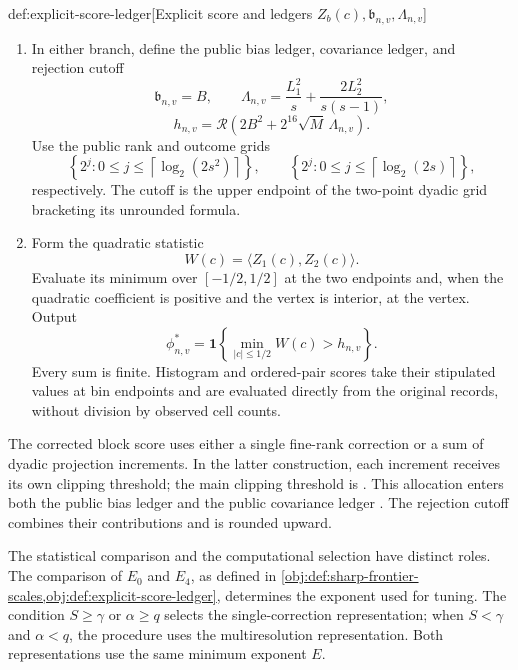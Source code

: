 \begin{algorithmv}{def:explicit-score-ledger}[Explicit score and ledgers \(Z_b(c),\mathfrak b_{n,v},\Lambda_{n,v}\)]
\begin{enumerate}
\[-\sum_{j=1}^{L}U_{b,D_j,T_j}(c),
\]
\[
B=
400K^{-S}+20T_0^{1-p}
+10\sum_{j=1}^{L}a_jT_j^{1-p},
\]
\[
L_1=
16\sqrt{V_0}
+8\sum_{j=1}^{L}\bigl(d_j+a_j\sqrt{V_j}\bigr),
\]
\[
L_2=
4\left(
\sqrt{MV_0}+\sum_{j=1}^{L}\sqrt{R_jV_j}
\right).
\]
\item In either branch, define the public bias ledger, covariance ledger, and rejection cutoff
\[
\mathfrak b_{n,v}=B,
\qquad
\Lambda_{n,v}
=
\frac{L_1^2}{s}
+\frac{2L_2^2}{s(s-1)},
\]
\[
h_{n,v}
=
\mathcal R\!\left(
2B^2+2^{16}\sqrt M\,\Lambda_{n,v}
\right).
\]
Use the public rank and outcome grids
\[
\left\{2^j:0\le j\le\left\lceil\log_2(2s^2)\right\rceil\right\},
\qquad
\left\{2^j:0\le j\le\left\lceil\log_2(2s)\right\rceil\right\},
\]
respectively. The cutoff is the upper endpoint of the two-point dyadic grid bracketing its unrounded formula.
\item Form the quadratic statistic
\[
W(c)=\langle Z_1(c),Z_2(c)\rangle.
\]
Evaluate its minimum over \([-1/2,1/2]\) at the two endpoints and, when the quadratic coefficient is positive and the vertex is interior, at the vertex. Output
\[
\phi^*_{n,v}
=
\mathbf 1\!\left\{
\min_{|c|\le1/2}W(c)>h_{n,v}
\right\}.
\]
Every sum is finite. Histogram and ordered-pair scores take their stipulated values at bin endpoints and are evaluated directly from the original records, without division by observed cell counts.
\end{enumerate}
\end{algorithmv}

The corrected block score  uses either a single fine-rank correction or a sum of dyadic projection increments. In the latter construction, each increment receives its own clipping threshold; the main clipping threshold is . This allocation enters both the public bias ledger  and the public covariance ledger . The rejection cutoff  combines their contributions and is rounded upward.

The statistical comparison and the computational selection have distinct roles. The comparison of \(E_0\) and \(E_4\), as defined in \cref{obj:def:sharp-frontier-scales,obj:def:explicit-score-ledger}, determines the exponent used for tuning. The condition \(S\ge\gamma\) or \(\alpha\ge q\) selects the single-correction representation; when \(S<\gamma\) and \(\alpha<q\), the procedure uses the multiresolution representation. Both representations use the same minimum exponent \(E\).


